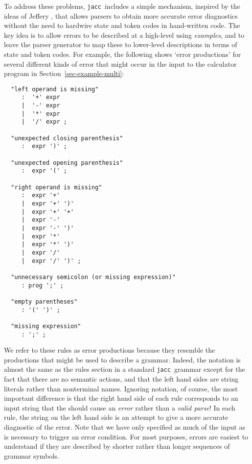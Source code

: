 \documentclass[12pt]{article}
\def\jacc{{\tt jacc}}
\begin{document}
To address these problems, \jacc\ includes a simple mechanism, inspired
by the ideas of Jeffery \cite{Jeffery:merr}, that allows parsers to
obtain more accurate error diagnostics without the need to hardwire
state and token codes in hand-written code.  The key idea is to allow
errors to be described at a high-level using {\em examples}, and to leave
the parser generator to map these to lower-level descriptions in terms of
state and token codes.  For example, the following shows `error productions'
for several different kinds of error that might occur in the input to the
calculator program in Section~\ref{sec-example-multi}:
{\small
\begin{verbatim}
  "left operand is missing"
     :  '+' expr
     |  '-' expr
     |  '*' expr
     |  '/' expr ;

  "unexpected closing parenthesis"
     :  expr ')' ;

  "unexpected opening parenthesis"
     :  expr '(' ;

  "right operand is missing"
     :  expr '+'
     |  expr '+' ')'
     |  expr '+' '+'
     |  expr '-'
     |  expr '-' ')'
     |  expr '*'
     |  expr '*' ')'
     |  expr '/'
     |  expr '/' ')' ;

  "unnecessary semicolon (or missing expression)"
     : prog ';' ;

  "empty parentheses"
     : '(' ')' ;

  "missing expression"
     : ';' ;
\end{verbatim}
}%
We refer to these rules as error productions because they resemble
the productions that might be used to describe a grammar.  Indeed,
the notation is almost the same as the rules section in a standard
\jacc\ grammar except for the fact that there are no semantic
actions, and that the left hand sides are string literals rather than
nonterminal names.  Ignoring notation, of course, the most important
difference is that the right hand side of each rule corresponds to
an input string that the should cause an {\em error}\/ rather than
a {\em valid parse}!  In each rule, the string on the left hand
side is an attempt to give a more accurate diagnostic of the error.
Note that we have only specified as much of the input as is necessary
to trigger an error condition.  For most purposes, errors are easiest
to understand if they are described by shorter rather than longer
sequences of grammar symbols.
\end{document}
